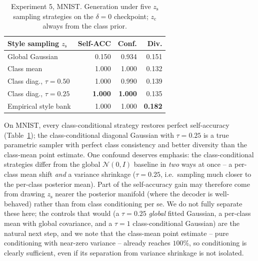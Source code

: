 \documentclass[10pt,letterpaper]{article}
\newcommand{\zc}{z_{\mathrm{c}}}
\newcommand{\zs}{z_{\mathrm{s}}}
\begin{document}
\begin{table}[t]
\centering
\small
\caption{Experiment 5, MNIST. Generation under five $\zs$ sampling
         strategies on the $\delta{=}0$ checkpoint; $\zc$ always from the
         class prior.}
\label{tab:sampling}
\begin{tabular}{lrrr}
\toprule
Style sampling $\zs$ & Self-ACC & Conf. & Div. \\
\midrule
Global Gaussian            & 0.150 & 0.934 & 0.151 \\
Class mean                 & 1.000 & 1.000 & 0.132 \\
Class diag., $\tau{=}0.50$ & 1.000 & 0.990 & 0.139 \\
Class diag., $\tau{=}0.25$ & \textbf{1.000} & \textbf{1.000} & 0.135 \\
Empirical style bank       & 1.000 & 1.000 & \textbf{0.182} \\
\bottomrule
\end{tabular}
\end{table}

On MNIST, every class-conditional strategy restores perfect self-accuracy
(Table~\ref{tab:sampling}); the class-conditional diagonal Gaussian with
$\tau{=}0.25$ is a true parametric sampler with perfect class consistency
and better diversity than the class-mean point estimate. One confound
deserves emphasis: the class-conditional strategies differ from the global
$\mathcal N(0,I)$ baseline in \emph{two} ways at once -- a per-class mean
shift \emph{and} a variance shrinkage ($\tau{=}0.25$, i.e.\ sampling much
closer to the per-class posterior mean). Part of the self-accuracy gain may
therefore come from drawing $\zs$ nearer the posterior manifold (where the
decoder is well-behaved) rather than from class conditioning per se. We do
not fully separate these here; the controls that would (a $\tau{=}0.25$
\emph{global} fitted Gaussian, a per-class mean with global covariance, and
a $\tau{=}1$ class-conditional Gaussian) are the natural next step, and we
note that the class-mean point estimate -- pure conditioning with near-zero
variance -- already reaches $100\%$, so conditioning is clearly sufficient,
even if its separation from variance shrinkage is not isolated.
\end{document}
